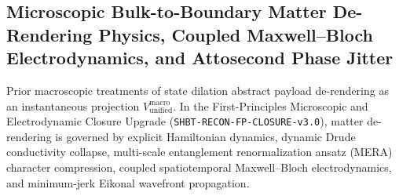 \documentclass[11pt,onecolumn]{article}
\begin{document}
\subsection{Microscopic Bulk-to-Boundary Matter De-Rendering Physics, Coupled Maxwell--Bloch Electrodynamics, and Attosecond Phase Jitter}
\label{subsec:micro_derender_mera}
Prior macroscopic treatments of state dilation abstract payload de-rendering as an instantaneous projection $V_{\text{unified}}^{\text{macro}}$. In the First-Principles Microscopic and Electrodynamic Closure Upgrade (\texttt{SHBT-RECON-}\allowbreak\texttt{FP-CLOSURE-v3.0}), matter de-rendering is governed by explicit Hamiltonian dynamics, dynamic Drude conductivity collapse, multi-scale entanglement renormalization ansatz (MERA) character compression, coupled spatiotemporal Maxwell--Bloch electrodynamics, and minimum-jerk Eikonal wavefront propagation.
\end{document}
